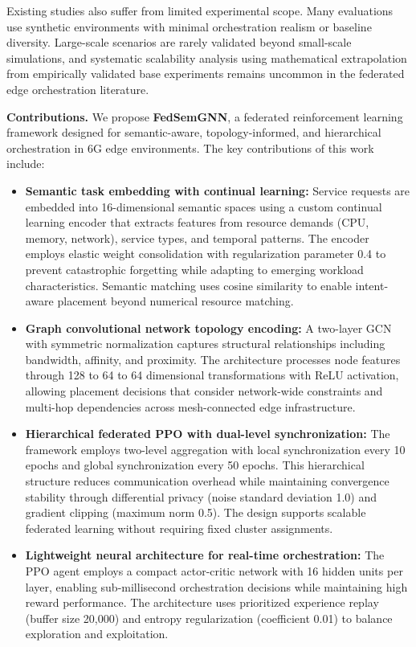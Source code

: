 Existing studies also suffer from limited experimental scope. Many evaluations use synthetic environments with minimal orchestration realism or baseline diversity. Large-scale scenarios are rarely validated beyond small-scale simulations, and systematic scalability analysis using mathematical extrapolation from empirically validated base experiments remains uncommon in the federated edge orchestration literature.

\noindent\textbf{Contributions.} We propose \textbf{FedSemGNN}, a federated reinforcement learning framework designed for semantic-aware, topology-informed, and hierarchical orchestration in 6G edge environments. The key contributions of this work include:

\begin{itemize}
	\item \textbf{Semantic task embedding with continual learning:} Service requests are embedded into 16-dimensional semantic spaces using a custom continual learning encoder that extracts features from resource demands (CPU, memory, network), service types, and temporal patterns. The encoder employs elastic weight consolidation with regularization parameter 0.4 to prevent catastrophic forgetting while adapting to emerging workload characteristics. Semantic matching uses cosine similarity to enable intent-aware placement beyond numerical resource matching.
	
	\item \textbf{Graph convolutional network topology encoding:} A two-layer GCN with symmetric normalization captures structural relationships including bandwidth, affinity, and proximity. The architecture processes node features through 128 to 64 to 64 dimensional transformations with ReLU activation, allowing placement decisions that consider network-wide constraints and multi-hop dependencies across mesh-connected edge infrastructure.
	
	\item \textbf{Hierarchical federated PPO with dual-level synchronization:} The framework employs two-level aggregation with local synchronization every 10 epochs and global synchronization every 50 epochs. This hierarchical structure reduces communication overhead while maintaining convergence stability through differential privacy (noise standard deviation 1.0) and gradient clipping (maximum norm 0.5). The design supports scalable federated learning without requiring fixed cluster assignments.
	
	\item \textbf{Lightweight neural architecture for real-time orchestration:} The PPO agent employs a compact actor-critic network with 16 hidden units per layer, enabling sub-millisecond orchestration decisions while maintaining high reward performance. The architecture uses prioritized experience replay (buffer size 20,000) and entropy regularization (coefficient 0.01) to balance exploration and exploitation.
	

\end{itemize}
